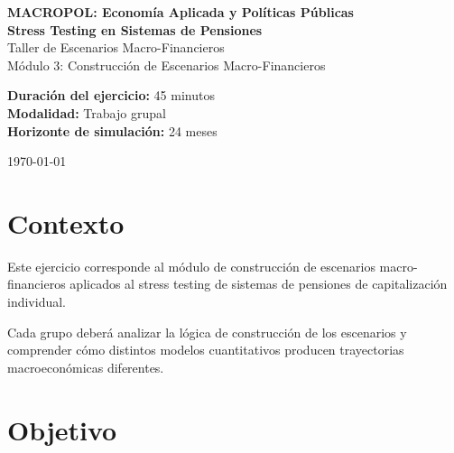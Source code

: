 \documentclass[12pt]{article}
\begin{document}

\begin{titlepage}

\centering

\vspace*{2cm}

{\Large \textbf{MACROPOL: Economía Aplicada y Políticas Públicas}} \\[1cm]

{\LARGE \textbf{Stress Testing en Sistemas de Pensiones}} \\[0.5cm]

{\Large Taller de Escenarios Macro-Financieros} \\[2cm]

{\large Módulo 3: Construcción de Escenarios Macro-Financieros} \\[1cm]

\vfill

\textbf{Duración del ejercicio:} 45 minutos \\[0.5cm]

\textbf{Modalidad:} Trabajo grupal \\[0.5cm]

\textbf{Horizonte de simulación:} 24 meses

\vfill

{\large \today}

\end{titlepage}


\section*{Contexto}

Este ejercicio corresponde al módulo de construcción de escenarios macro-financieros 
aplicados al stress testing de sistemas de pensiones de capitalización individual.

Cada grupo deberá analizar la lógica de construcción de los escenarios y comprender
cómo distintos modelos cuantitativos producen trayectorias macroeconómicas diferentes.

\vspace{0.5cm}

\section*{Objetivo}
\end{document}
